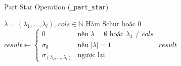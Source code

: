 \begin{algorithm}[H]
    \caption{Part Star Operation (\texttt{\_part\_star})}
    \begin{algorithmic}[1]
    \REQUIRE $\lambda = (\lambda_1, ..., \lambda_l)$, $cols \in \mathbb{N}$
    \ENSURE Hàm Schur hoặc $0$
    \STATE $result \gets \begin{cases}
        0 & \text{nếu } \lambda = \emptyset \text{ hoặc } \lambda_1 \neq cols \\
        \sigma_{\emptyset} & \text{nếu } |\lambda| = 1 \\
        \sigma_{(\lambda_2, ..., \lambda_l)} & \text{ngược lại}
    \end{cases}$
    \RETURN $result$
    \end{algorithmic}
    \end{algorithm}

